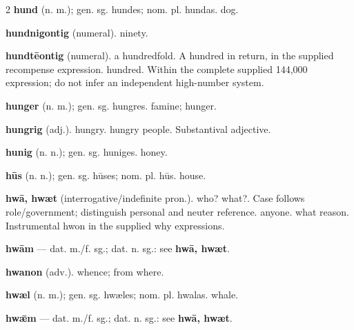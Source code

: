 \begin{multicols*}{2}
\textbf{hund} (n. m.); gen. sg. hundes; nom. pl. hundas. dog.\par
\textbf{hundnigontig} (numeral). ninety.\par
\textbf{hundtēontig} (numeral). a hundredfold. A hundred in return, in the supplied recompense expression. hundred. Within the complete supplied 144,000 expression; do not infer an independent high-number system.\par
\textbf{hunger} (n. m.); gen. sg. hungres. famine; hunger.\par
\textbf{hungrig} (adj.). hungry. hungry people. Substantival adjective.\par
\textbf{hunig} (n. n.); gen. sg. huniges. honey.\par
\textbf{hūs} (n. n.); gen. sg. hūses; nom. pl. hūs. house.\par
\textbf{hwā, hwæt} (interrogative/indefinite pron.). who? what?. Case follows role/government; distinguish personal and neuter reference. anyone. what reason. Instrumental hwon in the supplied why expressions.\par
\textbf{hwām} — dat. m./f. sg.; dat. n. sg.: see \textbf{hwā, hwæt}.\par
\textbf{hwanon} (adv.). whence; from where.\par
\textbf{hwæl} (n. m.); gen. sg. hwæles; nom. pl. hwalas. whale.\par
\textbf{hwǣm} — dat. m./f. sg.; dat. n. sg.: see \textbf{hwā, hwæt}.\par

\end{multicols*}
